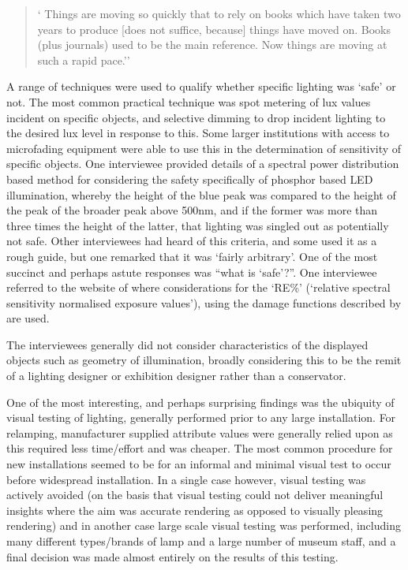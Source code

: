 \begin{quote}
`   Things are moving so quickly that to rely on books which have taken two years to produce [does not suffice, because] things have moved on. Books (plus journals) used to be the main reference. Now things are moving at such a rapid pace.''
\end{quote}

A range of techniques were used to qualify whether specific lighting was `safe' or not. The most common practical technique was spot metering of lux values incident on specific objects, and selective dimming to drop incident lighting to the desired lux level in response to this. Some larger institutions with access to microfading equipment were able to use this in the determination of sensitivity of specific objects. One interviewee provided details of a spectral power distribution based method for considering the safety specifically of phosphor based \gls{LED} illumination, whereby the height of the blue peak was compared to the height of the peak of the broader peak above 500nm, and if the former was more than three times the height of the latter, that lighting was singled out as potentially not safe. Other interviewees had heard of this criteria, and some used it as a rough guide, but one remarked that it was `fairly arbitrary'. One of the most succinct and perhaps astute responses was ``what is `safe'?''. One interviewee referred to the website of \citet{padfield_relative_2012} where considerations for the `RE\%' (`relative spectral sensitivity normalised exposure values'), using the damage functions described by \citet{s._aydinli_deterioration_1990} are used.

The interviewees generally did not consider characteristics of the displayed objects such as geometry of illumination, broadly considering this to be the remit of a lighting designer or exhibition designer rather than a conservator.

One of the most interesting, and perhaps surprising findings was the ubiquity of visual testing of lighting, generally performed prior to any large installation. For relamping, manufacturer supplied attribute values were generally relied upon as this required less time/effort and was cheaper. The most common procedure for new installations seemed to be for an informal and minimal visual test to occur before widespread installation. In a single case however, visual testing was actively avoided (on the basis that visual testing could not deliver meaningful insights where the aim was accurate rendering as opposed to visually pleasing rendering) and in another case large scale visual testing was performed, including many different types/brands of lamp and a large number of museum staff, and a final decision was made almost entirely on the results of this testing.

